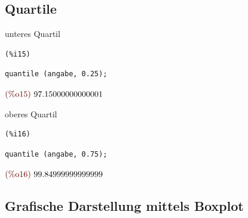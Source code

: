 \documentclass{article}
\begin{document}
\subsection{Quartile}


unteres Quartil

\noindent
\begin{minipage}[t]{8ex}{\color{red}\bf
\begin{verbatim}
(%i15) 
\end{verbatim}}
\end{minipage}
\begin{minipage}[t]{\textwidth}{\color{blue}
\begin{verbatim}
quantile (angabe, 0.25);
\end{verbatim}}
\end{minipage}
\begin{math}\displaystyle
\parbox{8ex}{\color{labelcolor}(\%o15) }
97.15000000000001
\end{math}

oberes Quartil

\noindent
\begin{minipage}[t]{8ex}{\color{red}\bf
\begin{verbatim}
(%i16) 
\end{verbatim}}
\end{minipage}
\begin{minipage}[t]{\textwidth}{\color{blue}
\begin{verbatim}
quantile (angabe, 0.75);
\end{verbatim}}
\end{minipage}
\begin{math}\displaystyle
\parbox{8ex}{\color{labelcolor}(\%o16) }
99.84999999999999
\end{math}


\subsection{Grafische Darstellung mittels Boxplot}
\end{document}
